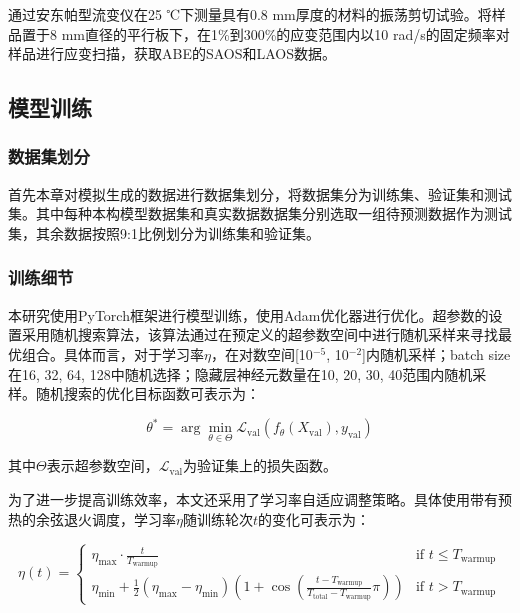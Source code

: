 通过安东帕型流变仪在25 ℃下测量具有0.8 mm厚度的材料的振荡剪切试验。将样品置于8 mm直径的平行板下，在1\%到300\%的应变范围内以10 rad/s的固定频率对样品进行应变扫描，获取ABE的SAOS和LAOS数据。
\subsection{模型训练}
\subsubsection{数据集划分}
首先本章对模拟生成的数据进行数据集划分，将数据集分为训练集、验证集和测试集。其中每种本构模型数据集和真实数据数据集分别选取一组待预测数据作为测试集，其余数据按照9:1比例划分为训练集和验证集。

\subsubsection{训练细节} \label{sec:training method}
本研究使用PyTorch框架进行模型训练，使用Adam优化器进行优化。超参数的设置采用随机搜索算法，该算法通过在预定义的超参数空间中进行随机采样来寻找最优组合。具体而言，对于学习率$\eta$，在对数空间[10$^{-5}$, 10$^{-2}$]内随机采样；batch size在{16, 32, 64, 128}中随机选择；隐藏层神经元数量在{10, 20, 30, 40}范围内随机采样。随机搜索的优化目标函数可表示为：

\begin{equation}
  \theta^* = \arg \min_{\theta \in \Theta} \mathcal{L}_{\text{val}}(f_\theta(X_{\text{val}}), y_{\text{val}})
\end{equation}

其中$\Theta$表示超参数空间，$\mathcal{L}_{\text{val}}$为验证集上的损失函数。

为了进一步提高训练效率，本文还采用了学习率自适应调整策略。具体使用带有预热的余弦退火调度，学习率$\eta$随训练轮次$t$的变化可表示为：

\begin{equation}
  \eta(t) = \begin{cases}
    \eta_{\text{max}} \cdot \frac{t}{T_{\text{warmup}}}                                                                                             & \text{if } t \leq T_{\text{warmup}} \\
    \eta_{\text{min}} + \frac{1}{2}(\eta_{\text{max}}-\eta_{\text{min}})(1+\cos(\frac{t-T_{\text{warmup}}}{T_{\text{total}}-T_{\text{warmup}}}\pi)) & \text{if } t > T_{\text{warmup}}
  \end{cases}
\end{equation}

